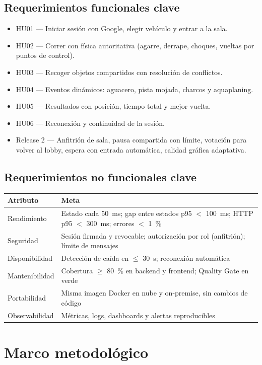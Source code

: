\documentclass[11pt,a4paper]{article}
\begin{document}
\subsection{Requerimientos funcionales clave}
\begin{itemize}
  \item HU01 --- Iniciar sesión con Google, elegir vehículo y entrar a la sala.
  \item HU02 --- Correr con física autoritativa (agarre, derrape, choques, vueltas por puntos de control).
  \item HU03 --- Recoger objetos compartidos con resolución de conflictos.
  \item HU04 --- Eventos dinámicos: aguacero, pista mojada, charcos y aquaplaning.
  \item HU05 --- Resultados con posición, tiempo total y mejor vuelta.
  \item HU06 --- Reconexión y continuidad de la sesión.
  \item Release 2 --- Anfitrión de sala, pausa compartida con límite, votación para volver al lobby, espera con entrada automática, calidad gráfica adaptativa.
\end{itemize}

\subsection{Requerimientos no funcionales clave}
\begin{tabularx}{\textwidth}{lL}
\toprule
\textbf{Atributo} & \textbf{Meta}\\\midrule
Rendimiento & Estado cada 50~ms; gap entre estados p95 $<$ 100~ms; HTTP p95 $<$ 300~ms; errores $<$ 1~\%\\
Seguridad & Sesión firmada y revocable; autorización por rol (anfitrión); límite de mensajes\\
Disponibilidad & Detección de caída en $\le$ 30~s; reconexión automática\\
Mantenibilidad & Cobertura $\ge$ 80~\% en backend y frontend; Quality Gate en verde\\
Portabilidad & Misma imagen Docker en nube y on-premise, sin cambios de código\\
Observabilidad & Métricas, logs, dashboards y alertas reproducibles\\
\bottomrule
\end{tabularx}

\section{Marco metodológico}
\end{document}
